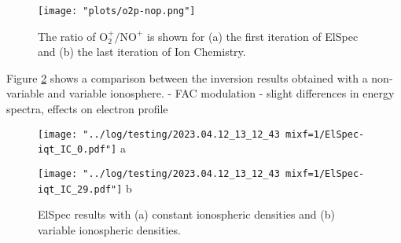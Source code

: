 \documentclass[10pt, a4paper]{article}
\numberwithin{equation}{section}										%
\begin{document}
\begin{figure}
	\centering
	\texttt{[image: "plots/o2p-nop.png"]}
	\caption{The ratio of $\mathrm{O_2^+/NO^+}$ is shown for (a) the first iteration of ElSpec and (b) the last iteration of Ion Chemistry.}
	\label{fig:ratio_o2p_nop}
\end{figure}
%
\par\medskip
%
Figure \ref{fig:comp} shows a comparison between the inversion results obtained with a non-variable and variable ionosphere. 
- FAC modulation
- slight differences in energy spectra, effects on electron profile
\begin{figure}
	\centering
    	\begin{minipage}{0.5\textwidth}
			\centering
			\texttt{[image: "../log/testing/2023.04.12\_13\_12\_43 mixf=1/ElSpec-iqt\_IC\_0.pdf"]}
			a
    	\end{minipage}%
    	\begin{minipage}{0.5\textwidth}
        	\centering
			\texttt{[image: "../log/testing/2023.04.12\_13\_12\_43 mixf=1/ElSpec-iqt\_IC\_29.pdf"]}
			b
    	\end{minipage}
    \caption{ElSpec results with (a) constant ionospheric densities and (b) variable ionospheric densities.}
    \label{fig:comp}
\end{figure}
\end{document}
